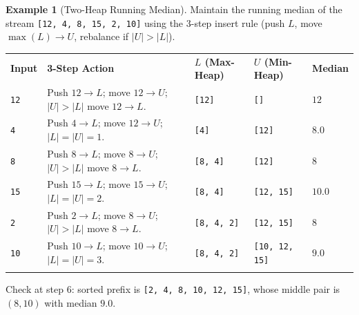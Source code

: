 \documentclass[11pt,a4paper]{article}
\theoremstyle{definition}
\newtheorem{example}{Example}[section]
\begin{document}
\begin{example}[Two-Heap Running Median]
Maintain the running median of the stream \texttt{[12, 4, 8, 15, 2, 10]} using the 3-step insert rule (push $L$, move $\max(L) \to U$, rebalance if $|U| > |L|$).

\begingroup\footnotesize{}
\begin{tabularx}{\textwidth}{>{\centering\arraybackslash}p{1.2cm} >{\raggedright\arraybackslash}X >{\raggedright\arraybackslash}p{2.7cm} >{\raggedright\arraybackslash}p{2.7cm} >{\centering\arraybackslash}p{1.5cm}}
\arrayrulecolor{primaryblue}\toprule[1.1pt]
\rowcolor{primaryblue!10}
\textcolor{primaryblue}{\textbf{Input}} & \textcolor{primaryblue}{\textbf{3-Step Action}} & \textcolor{primaryblue}{\textbf{$L$ (Max-Heap)}} & \textcolor{primaryblue}{\textbf{$U$ (Min-Heap)}} & \textcolor{primaryblue}{\textbf{Median}} \\
\arrayrulecolor{codeframe}\midrule[0.6pt]
\texttt{12} & Push $12 \to L$; move $12 \to U$; $|U|>|L|$ move $12 \to L$. & \texttt{[12]} & \texttt{[]} & $12$ \\
\texttt{4} & Push $4 \to L$; move $12 \to U$; $|L|=|U|=1$. & \texttt{[4]} & \texttt{[12]} & $8.0$ \\
\texttt{8} & Push $8 \to L$; move $8 \to U$; $|U|>|L|$ move $8 \to L$. & \texttt{[8, 4]} & \texttt{[12]} & $8$ \\
\texttt{15} & Push $15 \to L$; move $15 \to U$; $|L|=|U|=2$. & \texttt{[8, 4]} & \texttt{[12, 15]} & $10.0$ \\
\texttt{2} & Push $2 \to L$; move $8 \to U$; $|U|>|L|$ move $8 \to L$. & \texttt{[8, 4, 2]} & \texttt{[12, 15]} & $8$ \\
\texttt{10} & Push $10 \to L$; move $10 \to U$; $|L|=|U|=3$. & \texttt{[8, 4, 2]} & \texttt{[10, 12, 15]} & $9.0$ \\
\arrayrulecolor{primaryblue}\bottomrule[1.1pt]
\end{tabularx}\endgroup

\par\noindent Check at step 6: sorted prefix is \texttt{[2, 4, 8, 10, 12, 15]}, whose middle pair is $(8, 10)$ with median $9.0$.
\end{example}
\end{document}
